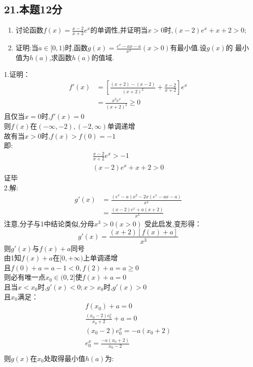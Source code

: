 \documentclass[UTF8]{ctexart}
\begin{document}
\subsection{21.本题12分}
\begin{enumerate}
    \item 讨论函数$f(x)=\frac{x-2}{x+2}e^x$的单调性,并证明当$x>0$时,$(x-2)e^x+x+2>0$;
    \item 证明:当$a\in [0,1)$时,函数$g(x)=\frac{e^x-ax-a}{x^2}(x>0)$有最小值.设$g(x)$的
          最小值为$h(a)$,求函数$h(a)$的值域.
\end{enumerate}
1.证明：\\
\[ \begin{aligned}
        f'(x) & =[\frac{(x+2)-(x-2)}{(x+2)^2}+\frac{x-2}{x+2}]e^x \\
              & =\frac{x^2e^x}{(x+2)^2}\geq 0
    \end{aligned}
\]
且仅当$x=0$时,$f'(x)=0$\\
则$f(x)$在$(-\infty,-2),(-2,\infty)$单调递增\\
故有当$x>0$时,$f(x)>f(0)=-1$\\
即:\[\begin{aligned}
        \frac{x-2}{x+2}e^x>-1 \\
        (x-2)e^x+x+2>0
    \end{aligned}    \]
证毕\\
2.解:\\
\[\begin{aligned}
    g'(x)&=\frac{(e^x-a)x^2-2x(e^x-ax-a)}{x^4}\\
    &=\frac{(x-2)e^x+a(x+2)}{x^3}
\end{aligned} \]
注意,分子与1中结论类似,分母$x^3>0(x>0)$
受此启发,变形得：
\[ g'(x)=\frac{(x+2)[f(x)+a]}{x^3} \]
则$g'(x)$与$f(x)+a$同号 \\
由1知$f(x)+a$在$[0,+\infty)$上单调递增 \\
且$f(0)+a=a-1<0,f(2)+a=a\geq 0$\\
则必有唯一点$x_0 \in (0,2]$使$f(x)+a=0$\\
且当$x<x_0$时,$g'(x)<0;x>x_0$时,$g'(x)>0$\\
且$x_0$满足：
\[\begin{aligned}
    f(x_0)+a=0 \\
    \frac{(x_0-2)e^x_0}{x_0+2}+a=0 \\
    (x_0-2)e^x_0=-a(x_0+2)\\
    e^x_0=\frac{-a(x_0+2)}{x_0-2}\\
\end{aligned}\]
则$g(x)$在$x_0$处取得最小值$h(a)$为:
\end{document}
